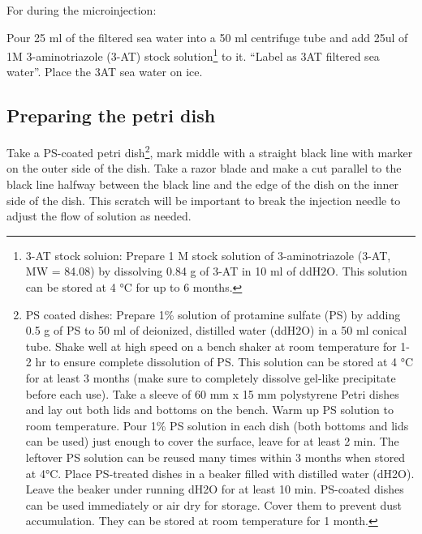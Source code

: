 \documentclass[
  letterpaper,
  DIV=11,
  numbers=noendperiod]{scrartcl}
\begin{document}
For during the microinjection:

Pour 25 ml of the filtered sea water into a 50 ml centrifuge tube and
add 25ul of 1M 3-aminotriazole (3-AT) stock solution\footnote{3-AT stock
  soluion: Prepare 1 M stock solution of 3-aminotriazole (3-AT, MW =
  84.08) by dissolving 0.84 g of 3-AT in 10 ml of ddH2O. This solution
  can be stored at 4 °C for up to 6 months.} to it. ``Label as 3AT
filtered sea water''. Place the 3AT sea water on ice.

\hypertarget{preparing-the-petri-dish}{%
\subsection{Preparing the petri dish}\label{preparing-the-petri-dish}}

Take a PS-coated petri dish\footnote{PS coated dishes: Prepare 1\%
  solution of protamine sulfate (PS) by adding 0.5 g of PS to 50 ml of
  deionized, distilled water (ddH2O) in a 50 ml conical tube. Shake well
  at high speed on a bench shaker at room temperature for 1-2 hr to
  ensure complete dissolution of PS. This solution can be stored at 4 °C
  for at least 3 months (make sure to completely dissolve gel-like
  precipitate before each use). Take a sleeve of 60 mm x 15 mm
  polystyrene Petri dishes and lay out both lids and bottoms on the
  bench. Warm up PS solution to room temperature. Pour 1\% PS solution
  in each dish (both bottoms and lids can be used) just enough to cover
  the surface, leave for at least 2 min. The leftover PS solution can be
  reused many times within 3 months when stored at 4°C. Place PS-treated
  dishes in a beaker filled with distilled water (dH2O). Leave the
  beaker under running dH2O for at least 10 min. PS-coated dishes can be
  used immediately or air dry for storage. Cover them to prevent dust
  accumulation. They can be stored at room temperature for 1 month.},
mark middle with a straight black line with marker on the outer side of
the dish. Take a razor blade and make a cut parallel to the black line
halfway between the black line and the edge of the dish on the inner
side of the dish. This scratch will be important to break the injection
needle to adjust the flow of solution as needed.
\end{document}
